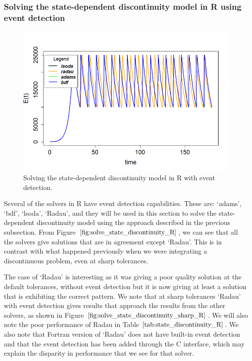 \subsubsection{Solving the state-dependent discontinuity model in R using event detection}
\begin{figure}[H]
\centering
\includegraphics[width=0.7\linewidth]{./figures/solve_state_discontinuity_R}
\caption{Solving the state-dependent discontinuity model in R with event detection.}
\label{fig:solve_state_discontinuity_R}
\end{figure}
Several of the solvers in R have event detection capabilities. These are: `adams', `bdf', `lsoda', `Radau', and they will be used in this section to solve the state-dependent discontinuity model using the approach described in the previous subsection. From Figure $\ref{fig:solve_state_discontinuity_R}$, we can see that all the solvers give solutions that are in agreement except `Radau'. This is in contrast with what happened previously when we were integrating a discontinuous problem, even at sharp tolerances. 

The case of `Radau' is interesting as it was giving a poor quality solution at the default tolerances, without event detection but it is now giving at least a solution that is exhibiting the correct pattern. We note that at sharp tolerances `Radau' with event detection gives results that approach the results from the other solvers, as shown in Figure $\ref{fig:solve_state_discontinuity_sharp_R}$. We will also note the poor performance of Radau in Table $\ref{tab:state_discontinuity_R}$. We also note that Fortran version of `Radau'  does not have built-in event detection and that the event detection has been added through the C interface, which may explain the disparity in performance that we see for that solver.

